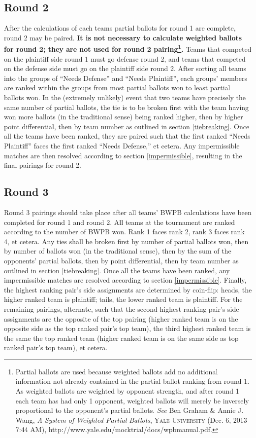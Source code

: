 \documentclass{article}
\begin{document}
\subsection{Round 2}
After the calculations of each teams partial ballots for round 1 are complete, round 2 may be paired.  \textbf{It is not necessary to calculate weighted ballots for round 2; they are not used for round 2 pairing\footnote{Partial ballots are used because weighted ballots add no additional information not already contained in the partial ballot ranking from round 1.  As weighted ballots are weighted by opponent strength, and after round 1 each team has had only 1 opponent, weighted ballots will merely be inversely proportional to the opponent's partial ballots.  \textit{See} Ben Graham \& Annie J. Wang, \textit{A System of Weighted Partial Ballots}, \textsc{Yale University} (Dec. 6, 2013 7:44 AM), http://www.yale.edu/mocktrial/docs/wpbmanual.pdf.}.}  Teams that competed on the plaintiff side round 1 must go defense round 2, and teams that competed on the defense side must go on the plaintiff side round 2.  After sorting all teams into the groups of ``Needs Defense'' and ``Needs Plaintiff'', each groups' members are ranked within the groups from most partial ballots won to least partial ballots won.  In the (extremely unlikely) event that two teams have precisely the same number of partial ballots, the tie is to be broken first with the team having won more ballots (in the traditional sense) being ranked higher, then by higher point differential, then by team number as outlined in section \ref{tiebreaking}.  Once all the teams have been ranked, they are paired such that the first ranked ``Needs Plaintiff'' faces the first ranked ``Needs Defense,'' et cetera.  Any impermissible matches are then resolved according to section \ref{impermissible}, resulting in the final pairings for round 2.
\subsection{Round 3}
Round 3 pairings should take place after all teams' BWPB calculations have been completed for round 1 and round 2.  All teams at the tournament are ranked according to the number of BWPB won.  Rank 1 faces rank 2, rank 3 faces rank 4, et cetera.  Any ties shall be broken first by number of partial ballots won, then by number of ballots won (in the traditional sense), then by the sum of the opponents' partial ballots, then by point differential, then by team number as outlined in section \ref{tiebreaking}.  Once all the teams have been ranked, any impermissible matches are resolved according to section \ref{impermissible}. Finally, the highest ranking pair's side assignments are determined by coin-flip: heads, the higher ranked team is plaintiff; tails, the lower ranked team is plaintiff. For the remaining pairings, alternate, such that the second highest ranking pair's side assignments are the opposite of the top pairing (higher ranked team is on the opposite side as the top ranked pair's top team), the third highest ranked team is the same the top ranked team (higher ranked team is on the same side as top ranked pair's top team), et cetera.
\end{document}
